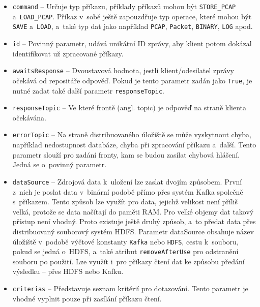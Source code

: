 \begin{itemize}
    \item \texttt{command} -- Určuje typ příkazu, příklady příkazů mohou být \texttt{STORE\_PCAP} a~\texttt{LOAD\_PCAP}. Příkaz v~sobě ještě zapouzdřuje typ operace, které mohou být \texttt{SAVE} a~\texttt{LOAD}, a~také typ dat jako například \texttt{PCAP}, \texttt{Packet}, \texttt{BINARY}, \texttt{LOG} apod.
    
    \item \texttt{id} -- Povinný parametr, udává unikátní ID zprávy, aby klient potom dokázal identifikovat už zpracované příkazy.
    
    \item \texttt{awaitsResponse} -- Dvoustavová hodnota, jestli klient/odesilatel zprávy očekává od repositáře odpověď. Pokud je tento parametr zadán jako \texttt{True}, je nutné zadat také další parametr \texttt{responseTopic}.
    
    \item \texttt{responseTopic} -- Ve které frontě (angl. topic) je odpověď na straně klienta očekávána.
    
    \item \texttt{errorTopic} -- Na straně distribuovaného úložiště se může vyskytnout chyba, například nedostupnost databáze, chyba při zpracování příkazu a~další. Tento parametr slouží pro zadání fronty, kam se budou zasílat chybová hlášení. Jedná se o~povinný parametr.
    
    \item \texttt{dataSource} -- Zdrojová data k~uložení lze zaslat dvojím způsobem. První z~nich je poslat data v~binární podobě přímo přes systém Kafka společně s~příkazem. Tento způsob lze využít pro data, jejichž velikost není příliš velká, protože se data načítají do paměti RAM. Pro velké objemy dat takový přístup není vhodný. Proto existuje ještě druhý způsob, a~to předat data přes distribuovaný souborový systém HDFS. Parametr dataSource obsahuje název úložiště v~podobě výčtové konstanty \texttt{Kafka} nebo \texttt{HDFS}, cestu k~souboru, pokud se jedná o~HDFS, a~také atribut \texttt{removeAfterUse} pro odstranění souboru po použití. Lze využít i~pro příkazy čtení dat ke způsobu předání výsledku -- přes HDFS nebo Kafku.
    
    \item \texttt{criterias} -- Představuje seznam kritérií pro dotazování. Tento parametr je vhodné vyplnit pouze při zasílání příkazu čtení.
\end{itemize}

